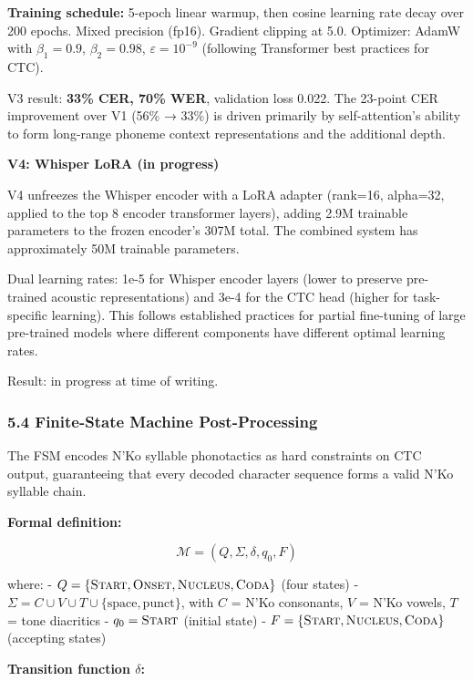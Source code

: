\documentclass[
]{article}
\begin{document}
\textbf{Training schedule:} 5-epoch linear warmup, then cosine learning
rate decay over 200 epochs. Mixed precision (fp16). Gradient clipping at
5.0. Optimizer: AdamW with \(\beta_1=0.9\), \(\beta_2=0.98\),
\(\varepsilon=10^{-9}\) (following Transformer best practices for CTC).

V3 result: \textbf{33\% CER, 70\% WER}, validation loss 0.022. The
23-point CER improvement over V1 (56\% → 33\%) is driven primarily by
self-attention's ability to form long-range phoneme context
representations and the additional depth.

\textbf{V4: Whisper LoRA (in progress)}

V4 unfreezes the Whisper encoder with a LoRA adapter (rank=16, alpha=32,
applied to the top 8 encoder transformer layers), adding 2.9M trainable
parameters to the frozen encoder's 307M total. The combined system has
approximately 50M trainable parameters.

Dual learning rates: 1e-5 for Whisper encoder layers (lower to preserve
pre-trained acoustic representations) and 3e-4 for the CTC head (higher
for task-specific learning). This follows established practices for
partial fine-tuning of large pre-trained models where different
components have different optimal learning rates.

Result: in progress at time of writing.

\subsubsection{5.4 Finite-State Machine
Post-Processing}\label{finite-state-machine-post-processing}

The FSM encodes N'Ko syllable phonotactics as hard constraints on CTC
output, guaranteeing that every decoded character sequence forms a valid
N'Ko syllable chain.

\textbf{Formal definition:}

\[\mathcal{M} = (Q, \Sigma, \delta, q_0, F)\]

where: -
\(Q = \{\textsc{Start}, \textsc{Onset}, \textsc{Nucleus}, \textsc{Coda}\}\)
(four states) -
\(\Sigma = C \cup V \cup T \cup \{\text{space}, \text{punct}\}\), with
\(C\) = N'Ko consonants, \(V\) = N'Ko vowels, \(T\) = tone diacritics -
\(q_0 = \textsc{Start}\) (initial state) -
\(F = \{\textsc{Start}, \textsc{Nucleus}, \textsc{Coda}\}\) (accepting
states)

\textbf{Transition function \(\delta\):}
\end{document}
